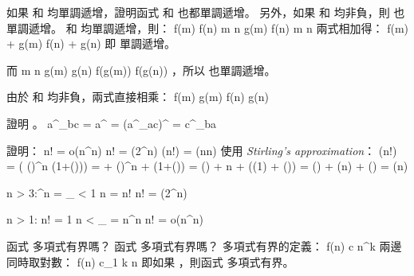 \startsection[
  reference={section:notationfunction},
  title={Standard notations and common functions},
]

\startEXERCISE
如果  和  均單調遞增，證明函式  和  也都單調遞增。
另外，如果  和  均非負，則  也單調遞增。
\stopEXERCISE
\startANSWER
{} 和  均單調遞增，則：
\startformula\startalign
 \NC f(m) \leq f(n) \NC \quad {} m \leq n \NR
 \NC g(m) \leq f(n) \NC \quad {} m \leq n \NR
\stopalign\stopformula
兩式相加得：
\startformula
f(m) + g(m) \leq f(n) + g(n)
\stopformula
即  單調遞增。

而
\startformula\startalign
 \NC m \NC \leq n \NR
\NC g(m) \NC \leq g(n) \NR
\NC f(g(m)) \NC \leq f(g(n)) \NR
\stopalign\stopformula
，所以  也單調遞增。

由於  和  均非負，兩式直接相乘：
\startformula
f(m) \cdot g(m) \leq f(n) \cdot g(n)
\stopformula
\stopANSWER

\startEXERCISE
證明 。
\stopEXERCISE
\startANSWER
\startformula
a^{\log_bc}
= a^{}
= (a^{\log_ac})^{}
= c^{\log_ba}
\stopformula
\stopANSWER

證明：
\startformula\startalign
 \NC n! \NC = o(n^n) \NR
 \NC n! \NC = \omega(2^n) \NR
 \NC \lg(n!) \NC = \Theta(n\lg n) \NR
\stopalign\stopformula
\stopEXERCISE
\startANSWER
使用 {\em Stirling's approximation}：
\startformula\startalign
\NC \lg(n!) \NC= \lg( ()^n (1+\Theta())) \NR
\NC         \NC= \lg{} + \lg()^n + \lg(1+\Theta()) \NR
\NC         \NC= \Theta() + n + \lg(\Theta(1) + \Theta()) \NR
\NC         \NC= \Theta() + \Theta(n) + \Theta() \NR
\NC         \NC= \Theta(n) \NR
\stopalign\stopformula

\startformula
\forall n > 3:^n = _{}
      < 1  \cdot \cdots \cdot n
      = n!
      \quad\Rightarrow\quad n! = \omega(2^n)
\stopformula

\startformula
\forall n > 1:\quad
  n! = 1  \cdot \cdots n
     < _{}
     = n^n
     \quad\Rightarrow\quad n! = o(n^n)
\stopformula
\stopANSWER

\startEXERCISE
函式  多項式有界嗎？
函式  多項式有界嗎？
\stopEXERCISE
\startANSWER
多項式有界的定義：
\startformula
 f(n) \leq c n^k
\stopformula
兩邊同時取對數：
\startformula
 \lg f(n) \leq c_1 k \lg n
\stopformula
即如果 ，則函式  多項式有界。

